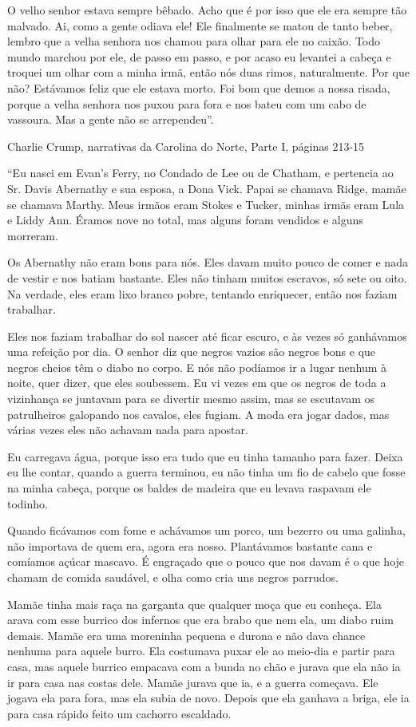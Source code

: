 O velho senhor estava sempre bêbado. Acho que é por isso que ele era
sempre tão malvado. Ai, como a gente odiava ele! Ele finalmente se matou
de tanto beber, lembro que a velha senhora nos chamou para olhar para
ele no caixão. Todo mundo marchou por ele, de passo em passo, e por
acaso eu levantei a cabeça e troquei um olhar com a minha irmã, então
nós duas rimos, naturalmente. Por que não? Estávamos feliz que ele
estava morto. Foi bom que demos a nossa risada, porque a velha senhora
nos puxou para fora e nos bateu com um cabo de vassoura. Mas a gente não
se arrependeu''.

Charlie Crump, narrativas da Carolina do Norte, Parte I, páginas 213-15

``Eu nasci em Evan's Ferry, no Condado de Lee ou de Chatham, e pertencia
ao Sr. Davis Abernathy e sua esposa, a Dona Vick. Papai se chamava
Ridge, mamãe se chamava Marthy. Meus irmãos eram Stokes e Tucker, minhas
irmãs eram Lula e Liddy Ann. Éramos nove no total, mas alguns foram
vendidos e alguns morreram.

Os Abernathy não eram bons para nós. Eles davam muito pouco de comer e
nada de vestir e nos batiam bastante. Eles não tinham muitos escravos,
só sete ou oito. Na verdade, eles eram lixo branco pobre, tentando
enriquecer, então nos faziam trabalhar.

Eles nos faziam trabalhar do sol nascer até ficar escuro, e às vezes só
ganhávamos uma refeição por dia. O senhor diz que negros vazios são
negros bons e que negros cheios têm o diabo no corpo. E nós não podíamos
ir a lugar nenhum à noite, quer dizer, que eles soubessem. Eu vi vezes
em que os negros de toda a vizinhança se juntavam para se divertir mesmo
assim, mas se escutavam os patrulheiros galopando nos cavalos, eles
fugiam. A moda era jogar dados, mas várias vezes eles não achavam nada
para apostar.

Eu carregava água, porque isso era tudo que eu tinha tamanho para fazer.
Deixa eu lhe contar, quando a guerra terminou, eu não tinha um fio de
cabelo que fosse na minha cabeça, porque os baldes de madeira que eu
levava raspavam ele todinho.

Quando ficávamos com fome e achávamos um porco, um bezerro ou uma
galinha, não importava de quem era, agora era nosso. Plantávamos
bastante cana e comíamos açúcar mascavo. É engraçado que o pouco que nos
davam é o que hoje chamam de comida saudável, e olha como cria uns
negros parrudos.

Mamãe tinha mais raça na garganta que qualquer moça que eu conheça. Ela
arava com esse burrico dos infernos que era brabo que nem ela, um diabo
ruim demais. Mamãe era uma moreninha pequena e durona e não dava chance
nenhuma para aquele burro. Ela costumava puxar ele ao meio-dia e partir
para casa, mas aquele burrico empacava com a bunda no chão e jurava que
ela não ia ir para casa nas costas dele. Mamãe jurava que ia, e a guerra
começava. Ele jogava ela para fora, mas ela subia de novo. Depois que
ela ganhava a briga, ele ia para casa rápido feito um cachorro
escaldado.

